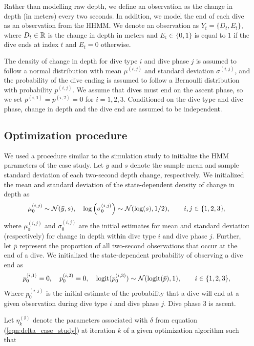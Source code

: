 Rather than modelling raw depth, we define an observation as the change in depth (in meters) every two seconds. In addition, we model the end of each dive as an observation from the HHMM. We denote an observation as $Y_t = \{D_t,E_t\}$, where $D_t \in \mathbb{R}$ is the change in depth in meters and $E_t \in \{0,1\}$ is equal to $1$ if the dive ends at index $t$ and $E_t = 0$ otherwise.

The density of change in depth for dive type $i$ and dive phase $j$ is assumed to follow a normal distribution with mean $\mu^{(i,j)}$ and standard deviation $\sigma^{(i,j)}$, and the probability of the dive ending is assumed to follow a Bernoulli distribution with probability $p^{(i,j)}$. We assume that dives must end on the ascent phase, so we set $p^{(i,1)} = p^{(i,2)} = 0$ for $i = 1,2,3$. Conditioned on the dive type and dive phase, change in depth and the dive end are assumed to be independent.

\subsection{Optimization procedure}

We used a procedure similar to the simulation study to initialize the HMM parameters of the case study. Let $\bar y$ and $s$ denote the sample mean and sample standard deviation of each two-second depth change, respectively. We initialized the mean and standard deviation of the state-dependent density of change in depth as
%
\begin{equation}
    \mu^{(i,j)}_0 \sim \mathcal{N}(\bar y, s), \quad \log\left(\sigma^{(i,j)}_0\right) \sim \mathcal{N}(\log(s),1/2), \qquad i,j \in \{1,2,3\},
\end{equation}
%
where $\mu^{(i,j)}_0$ and $\sigma^{(i,j)}_0$ are the initial estimates for mean and standard deviation (respectively) for change in depth within dive type $i$ and dive phase $j$. Further, let $\bar p$ represent the proportion of all two-second observations that occur at the end of a dive. We initialized the state-dependent probability of observing a dive end as
%
\begin{equation}
    p^{(i,1)}_0 = 0, \quad p^{(i,2)}_0 = 0, \quad \operatorname*{logit}(p^{(i,3)}_0) \sim \mathcal{N}(\operatorname*{logit}(\bar p),1), \qquad i \in \{1,2,3\},
\end{equation}
%
Where $p^{(i,j)}_0$ is the initial estimate of the probability that a dive will end at a given observation during dive type $i$ and dive phase $j$. Dive phase 3 is ascent.

Let $\eta^{(\delta)}_k$ denote the parameters associated with $\delta$ from equation (\ref{eqn:delta_case_study}) at iteration $k$ of a given optimization algorithm such that

